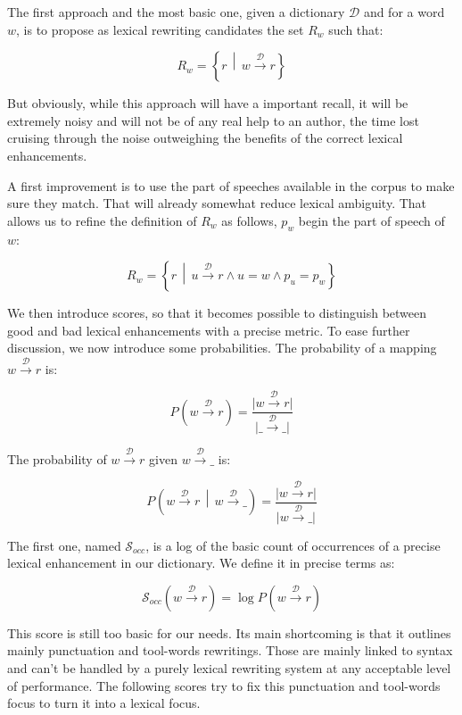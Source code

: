 \documentclass[a4paper, 11pt, onepage]{scrreprt}
\newcommand\maps[1]{\xrightarrow{\mathcal{#1}}}
\newcommand\card[1]{\lvert #1 \rvert}
\newcommand\suchthat{\, \middle| \,}
\newcommand\given{\, \middle| \,}
\newcommand\proba[2][]{P_{#1} \left( #2 \right)}
\begin{document}
The first approach and the most basic one, given a dictionary
$\mathcal{D}$ and for a word $w$, is to propose as lexical rewriting
candidates the set $R_w$ such that:

\[
R_w = \left\{r \suchthat w \maps{D} r\right\}
\]

But obviously, while this approach will have a important recall, it
will be extremely noisy and will not be of any real help to an author,
the time lost cruising through the noise outweighing the benefits of
the correct lexical enhancements.

A first improvement is to use the part of speeches available in the
corpus to make sure they match. That will already somewhat reduce
lexical ambiguity. That allows us to refine the definition of $R_w$ as
follows, $p_w$ begin the part of speech of $w$:

\begin{equation*}
  R_w = \left\{
    r \suchthat u \maps{D} r \land u = w \land p_u = p_w
  \right\}
\end{equation*}

We then introduce scores, so that it becomes possible to distinguish
between good and bad lexical enhancements with a precise metric. To
ease further discussion, we now introduce some probabilities. The
probability of a mapping $w \maps{D} r$ is:

\begin{equation*}
  \proba{w \maps{D} r} = \frac{\card{w \maps{D} r}}{\card{\_ \maps{D} \_}}
\end{equation*}

The probability of $w \maps{D} r$ given $w \maps{D} \_$ is:

\begin{equation*}
  \proba{w \maps{D} r \given w \maps{D} \_} = \frac{\card{w \maps{D} r}}{\card{w \maps{D} \_}}
\end{equation*}

The first one, named $\mathcal{S}_{occ}$, is a log of the basic count
of occurrences of a precise lexical enhancement in our dictionary. We
define it in precise terms as:

\begin{equation*}
  \mathcal{S}_{occ}(w \maps{D} r) = \log \proba{w \maps{D} r}
\end{equation*}

This score is still too basic for our needs. Its main shortcoming is
that it outlines mainly punctuation and tool-words rewritings. Those
are mainly linked to syntax and can't be handled by a purely lexical
rewriting system at any acceptable level of performance. The following
scores try to fix this punctuation and tool-words focus to turn it
into a lexical focus.
\end{document}
